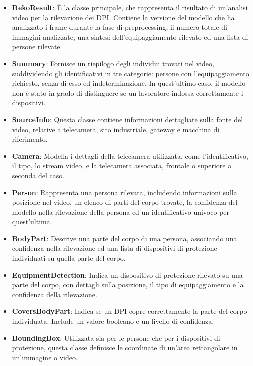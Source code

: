 \begin{itemize}
	\item \textbf{RekoResult}: È la classe principale, che rappresenta il risultato di un'analisi video per la rilevazione dei DPI. Contiene la versione del modello che ha analizzato i frame durante la fase di preprocessing, il numero totale di immagini analizzate, una sintesi dell'equipaggiamento rilevato ed una lista di persone rilevate.
	\item \textbf{Summary}: Fornisce un riepilogo degli individui trovati nel video, suddividendo gli identificativi in tre categorie: persone con l'equipaggiamento richiesto, senza di esso ed indeterminazione. In quest'ultimo caso, il modello non è stato in grado di distinguere se un lavoratore indossa correttamente i dispositivi.
	\item \textbf{SourceInfo}: Questa classe contiene informazioni dettagliate sulla fonte del video, relative a telecamera, sito industriale, gateway e macchina di riferimento.
	\item \textbf{Camera}: Modella i dettagli della telecamera utilizzata, come l'identificativo, il tipo, lo stream video, e la telecamera associata, frontale o superiore a seconda del caso.
	\item \textbf{Person}: Rappresenta una persona rilevata, includendo informazioni sulla posizione nel video, un elenco di parti del corpo trovate, la confidenza del modello nella rilevazione della persona ed un identificativo univoco per quest'ultima.
	\item \textbf{BodyPart}: Descrive una parte del corpo di una persona, associando una confidenza nella rilevazione ed una lista di dispositivi di protezione individuati su quella parte del corpo.
	\item \textbf{EquipmentDetection}: Indica un dispositivo di protezione rilevato su una parte del corpo, con dettagli sulla posizione, il tipo di equipaggiamento e la confidenza della rilevazione.
	\item \textbf{CoversBodyPart}: Indica se un DPI copre correttamente la parte del corpo individuata. Include un valore booleano e un livello di confidenza.
	\item \textbf{BoundingBox}: Utilizzata sia per le persone che per i dispositivi di protezione, questa classe definisce le coordinate di un'area rettangolare in un'immagine o video.
\end{itemize}

